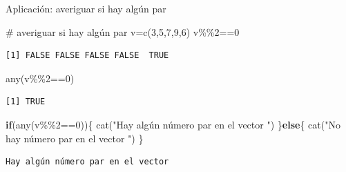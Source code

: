 \documentclass[
  ignorenonframetext,
  aspectratio=169,
  spanish,
]{beamer}
\newenvironment{Shaded}{\begin{snugshade}}{\end{snugshade}}
\newcommand{\CommentTok}[1]{\textcolor[rgb]{0.37,0.37,0.37}{#1}}
\newcommand{\ControlFlowTok}[1]{\textcolor[rgb]{0.00,0.23,0.31}{\textbf{#1}}}
\newcommand{\DecValTok}[1]{\textcolor[rgb]{0.68,0.00,0.00}{#1}}
\newcommand{\FunctionTok}[1]{\textcolor[rgb]{0.28,0.35,0.67}{#1}}
\newcommand{\NormalTok}[1]{\textcolor[rgb]{0.00,0.23,0.31}{#1}}
\newcommand{\OtherTok}[1]{\textcolor[rgb]{0.00,0.23,0.31}{#1}}
\newcommand{\SpecialCharTok}[1]{\textcolor[rgb]{0.37,0.37,0.37}{#1}}
\newcommand{\StringTok}[1]{\textcolor[rgb]{0.13,0.47,0.30}{#1}}
\begin{document}
\begin{frame}[fragile]{Aplicación: averiguar si hay algún par}
\label{aplicaciuxf3n-averiguar-si-hay-alguxfan-par}
\begin{Shaded}
\begin{Highlighting}[]
\CommentTok{\# averiguar si hay algún par }
\NormalTok{v}\OtherTok{=}\FunctionTok{c}\NormalTok{(}\DecValTok{3}\NormalTok{,}\DecValTok{5}\NormalTok{,}\DecValTok{7}\NormalTok{,}\DecValTok{9}\NormalTok{,}\DecValTok{6}\NormalTok{) }
\NormalTok{v}\SpecialCharTok{\%\%}\DecValTok{2}\SpecialCharTok{==}\DecValTok{0}
\end{Highlighting}
\end{Shaded}

\begin{verbatim}
[1] FALSE FALSE FALSE FALSE  TRUE
\end{verbatim}

\begin{Shaded}
\begin{Highlighting}[]
\FunctionTok{any}\NormalTok{(v}\SpecialCharTok{\%\%}\DecValTok{2}\SpecialCharTok{==}\DecValTok{0}\NormalTok{)}
\end{Highlighting}
\end{Shaded}

\begin{verbatim}
[1] TRUE
\end{verbatim}

\begin{Shaded}
\begin{Highlighting}[]
\ControlFlowTok{if}\NormalTok{(}\FunctionTok{any}\NormalTok{(v}\SpecialCharTok{\%\%}\DecValTok{2}\SpecialCharTok{==}\DecValTok{0}\NormalTok{))\{}
    \FunctionTok{cat}\NormalTok{(}\StringTok{"Hay algún número par en el vector  "}\NormalTok{)}
\NormalTok{\}}\ControlFlowTok{else}\NormalTok{\{}
    \FunctionTok{cat}\NormalTok{(}\StringTok{"No hay número par en el vector  "}\NormalTok{) }
\NormalTok{\}}
\end{Highlighting}
\end{Shaded}

\begin{verbatim}
Hay algún número par en el vector  
\end{verbatim}
\end{frame}
\end{document}
